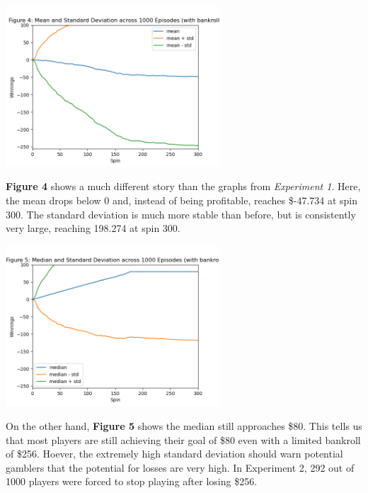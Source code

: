 \documentclass[
	letterpaper, %
]{jdf}
\begin{document}
\begin{jdffigure}
\includegraphics[height=6cm]{Figures/figure4.png}%
\label{fig:figure4}%
\end{jdffigure}

\textbf{Figure 4} shows a much different story than the graphs from \emph{Experiment 1}. 
Here, the mean drops below 0 and, instead of being profitable, reaches \$-47.734 at spin 300.
The standard deviation is much more stable than before, but is consistently very large, reaching 198.274 at spin 300.

\begin{jdffigure}
\includegraphics[height=6cm]{Figures/figure5.png}%
\label{fig:figure5}%
\end{jdffigure}

On the other hand, \textbf{Figure 5} shows the median still approaches \$80.
This tells us that most players are still achieving their goal of \$80 even with a limited bankroll of \$256.
Hoever, the extremely high standard deviation should warn potential gamblers that the potential for losses are very high.
In Experiment 2, 292 out of 1000 players were forced to stop playing after losing \$256.
\end{document}
